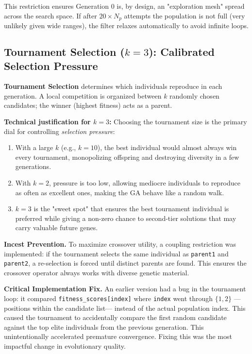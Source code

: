 \documentclass[12pt, a4paper]{article}
\begin{document}
This restriction ensures Generation 0 is, by design, an "exploration mesh" spread across
the search space. If after $20 \times N_p$ attempts the population is not full (very
unlikely given wide ranges), the filter relaxes automatically to avoid infinite loops.

\subsection{Tournament Selection ($k=3$): Calibrated Selection Pressure}

\textbf{Tournament Selection} determines which individuals reproduce in each generation.
A local competition is organized between $k$ randomly chosen candidates; the winner
(highest fitness) acts as a parent.

\textbf{Technical justification for $k=3$:} Choosing the tournament size is the primary
dial for controlling \textit{selection pressure}:
\begin{enumerate}
  \item With a large $k$ (e.g., $k=10$), the best individual would almost always win
        every tournament, monopolizing offspring and destroying diversity in a few
        generations.
  \item With $k=2$, pressure is too low, allowing mediocre individuals to reproduce
        as often as excellent ones, making the GA behave like a random walk.
  \item $k=3$ is the "sweet spot" that ensures the best tournament individual is
        preferred while giving a non-zero chance to second-tier solutions that may
        carry valuable future genes.
\end{enumerate}

\textbf{Incest Prevention.} To maximize crossover utility, a coupling restriction was
implemented: if the tournament selects the same individual as \texttt{parent1} and
\texttt{parent2}, a re-selection is forced until distinct parents are found. This
ensures the crossover operator always works with diverse genetic material.

\textbf{Critical Implementation Fix.} An earlier version had a bug in the tournament
loop: it compared \texttt{fitness\_scores[index]} where \texttt{index} went through
$\{1, 2\}$ —positions within the candidate list— instead of the actual population index.
This caused the tournament to accidentally compare the first random candidate against
the top elite individuals from the previous generation. This unintentionally accelerated
premature convergence. Fixing this was the most impactful change in evolutionary quality.
\end{document}

